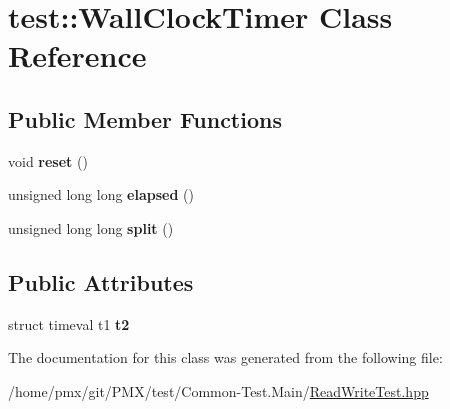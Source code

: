 \hypertarget{classtest_1_1WallClockTimer}{}\section{test\+:\+:Wall\+Clock\+Timer Class Reference}
\label{classtest_1_1WallClockTimer}
\subsection*{Public Member Functions}
\begin{DoxyCompactItemize}
\item 
\mbox{\label{classtest_1_1WallClockTimer_ae37cbb634e8c9f1fee016e4d2af7cac7}} 
void {\bfseries reset} ()
\item 
\mbox{\label{classtest_1_1WallClockTimer_a3608711a27b1bb3fec020f3cbe1aa1df}} 
unsigned long long {\bfseries elapsed} ()
\item 
\mbox{\label{classtest_1_1WallClockTimer_ad939c227074e8cbbec300a2e884af87e}} 
unsigned long long {\bfseries split} ()
\end{DoxyCompactItemize}
\subsection*{Public Attributes}
\begin{DoxyCompactItemize}
\item 
\mbox{\label{classtest_1_1WallClockTimer_a8bb1312b37a2d1191cb6e3f2489905c5}} 
struct timeval t1 {\bfseries t2}
\end{DoxyCompactItemize}


The documentation for this class was generated from the following file\+:\begin{DoxyCompactItemize}
\item 
/home/pmx/git/\+P\+M\+X/test/\+Common-\/\+Test.\+Main/\hyperlink{ReadWriteTest_8hpp}{Read\+Write\+Test.\+hpp}\end{DoxyCompactItemize}
